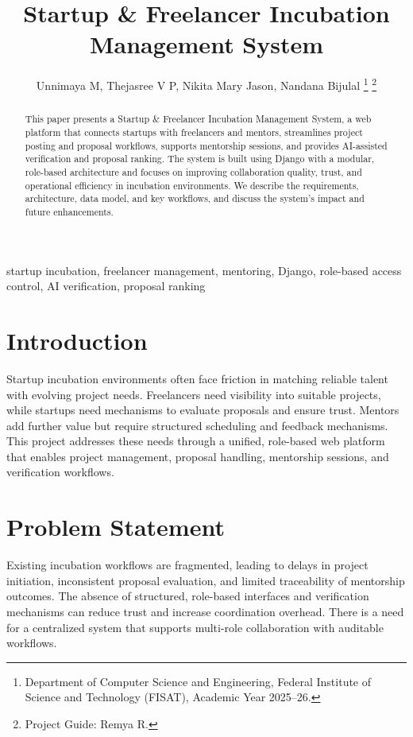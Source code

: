 ﻿\documentclass[journal]{IEEEtran}
\title{Startup \& Freelancer Incubation Management System}
\author{Unnimaya M, Thejasree V P, Nikita Mary Jason, Nandana Bijulal%
\thanks{Department of Computer Science and Engineering, Federal Institute of Science and Technology (FISAT), Academic Year 2025--26.}%
\thanks{Project Guide: Remya R.}}
\begin{document}
\maketitle

\begin{abstract}
This paper presents a Startup \& Freelancer Incubation Management System, a web platform that connects startups with freelancers and mentors, streamlines project posting and proposal workflows, supports mentorship sessions, and provides AI-assisted verification and proposal ranking. The system is built using Django with a modular, role-based architecture and focuses on improving collaboration quality, trust, and operational efficiency in incubation environments. We describe the requirements, architecture, data model, and key workflows, and discuss the system's impact and future enhancements.
\end{abstract}

\begin{IEEEkeywords}
startup incubation, freelancer management, mentoring, Django, role-based access control, AI verification, proposal ranking
\end{IEEEkeywords}

\section{Introduction}
Startup incubation environments often face friction in matching reliable talent with evolving project needs. Freelancers need visibility into suitable projects, while startups need mechanisms to evaluate proposals and ensure trust. Mentors add further value but require structured scheduling and feedback mechanisms. This project addresses these needs through a unified, role-based web platform that enables project management, proposal handling, mentorship sessions, and verification workflows.

\section{Problem Statement}
Existing incubation workflows are fragmented, leading to delays in project initiation, inconsistent proposal evaluation, and limited traceability of mentorship outcomes. The absence of structured, role-based interfaces and verification mechanisms can reduce trust and increase coordination overhead. There is a need for a centralized system that supports multi-role collaboration with auditable workflows.
\end{document}
